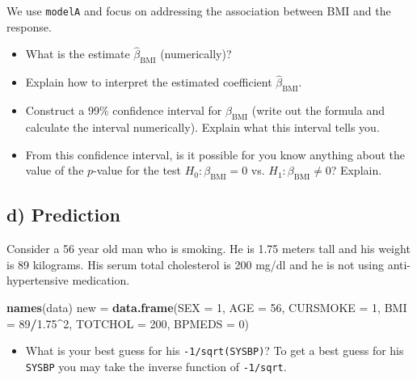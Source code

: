 \documentclass[]{article}
\newenvironment{Shaded}{\begin{snugshade}}{\end{snugshade}}
\newcommand{\DataTypeTok}[1]{\textcolor[rgb]{0.13,0.29,0.53}{#1}}
\newcommand{\DecValTok}[1]{\textcolor[rgb]{0.00,0.00,0.81}{#1}}
\newcommand{\FloatTok}[1]{\textcolor[rgb]{0.00,0.00,0.81}{#1}}
\newcommand{\KeywordTok}[1]{\textcolor[rgb]{0.13,0.29,0.53}{\textbf{#1}}}
\newcommand{\NormalTok}[1]{#1}
\newcommand{\OperatorTok}[1]{\textcolor[rgb]{0.81,0.36,0.00}{\textbf{#1}}}
\newcommand{\StringTok}[1]{\textcolor[rgb]{0.31,0.60,0.02}{#1}}
\providecommand{\tightlist}{%
  \setlength{\itemsep}{0pt}\setlength{\parskip}{0pt}}
\begin{document}
We use \texttt{modelA} and focus on addressing the association between
BMI and the response.

\begin{itemize}
\tightlist
\item
  What is the estimate \(\hat{\beta}_{\text{BMI}}\) (numerically)?
\item
  Explain how to interpret the estimated coefficient
  \(\hat{\beta}_{\text{BMI}}\).
\item
  Construct a 99\% confidence interval for \(\beta_{\text{BMI}}\) (write
  out the formula and calculate the interval numerically). Explain what
  this interval tells you.
\item
  From this confidence interval, is it possible for you know anything
  about the value of the \(p\)-value for the test
  \(H_0: \beta_{\text{BMI}}=0\) vs. \(H_1:\beta_{\text{BMI}} \neq 0\)?
  Explain.
\end{itemize}

\hypertarget{d-prediction}{%
\subsection{d) Prediction}\label{d-prediction}}

Consider a 56 year old man who is smoking. He is 1.75 meters tall and
his weight is 89 kilograms. His serum total cholesterol is 200 mg/dl and
he is not using anti-hypertensive medication.

\begin{Shaded}
\begin{Highlighting}[]
\KeywordTok{names}\NormalTok{(data)}
\NormalTok{new =}\StringTok{ }\KeywordTok{data.frame}\NormalTok{(}\DataTypeTok{SEX =} \DecValTok{1}\NormalTok{, }\DataTypeTok{AGE =} \DecValTok{56}\NormalTok{, }\DataTypeTok{CURSMOKE =} \DecValTok{1}\NormalTok{, }\DataTypeTok{BMI =} \DecValTok{89}\OperatorTok{/}\FloatTok{1.75}\OperatorTok{^}\DecValTok{2}\NormalTok{, }\DataTypeTok{TOTCHOL =} \DecValTok{200}\NormalTok{, }
    \DataTypeTok{BPMEDS =} \DecValTok{0}\NormalTok{)}
\end{Highlighting}
\end{Shaded}

\begin{itemize}
\tightlist
\item
  What is your best guess for his \texttt{-1/sqrt(SYSBP)}? To get a best
  guess for his \texttt{SYSBP} you may take the inverse function of
  \texttt{-1/sqrt}.
\end{itemize}
\end{document}
